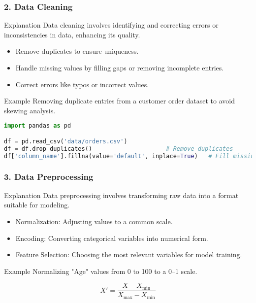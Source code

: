 \documentclass[aspectratio=169]{beamer}
\begin{document}
\begin{frame}
    \frametitle{2. Data Cleaning}
    \begin{block}{Explanation}
        Data cleaning involves identifying and correcting errors or inconsistencies in data, enhancing its quality.
    \end{block}

    \begin{itemize}
        \item Remove duplicates to ensure uniqueness.
        \item Handle missing values by filling gaps or removing incomplete entries.
        \item Correct errors like typos or incorrect values.
    \end{itemize}

    \begin{block}{Example}
        Removing duplicate entries from a customer order dataset to avoid skewing analysis.
    \end{block}
    
    \begin{lstlisting}[language=Python]
import pandas as pd

df = pd.read_csv('data/orders.csv')
df = df.drop_duplicates()                     # Remove duplicates
df['column_name'].fillna(value='default', inplace=True)   # Fill missing values
    \end{lstlisting}
\end{frame}

\begin{frame}
    \frametitle{3. Data Preprocessing}
    \begin{block}{Explanation}
        Data preprocessing involves transforming raw data into a format suitable for modeling.
    \end{block}

    \begin{itemize}
        \item Normalization: Adjusting values to a common scale.
        \item Encoding: Converting categorical variables into numerical form.
        \item Feature Selection: Choosing the most relevant variables for model training.
    \end{itemize}

    \begin{block}{Example}
        Normalizing "Age" values from 0 to 100 to a 0–1 scale.
    \end{block}

    \begin{equation}
        X' = \frac{X - X_{\text{min}}}{X_{\text{max}} - X_{\text{min}}}
    \end{equation}

\end{frame}
\end{document}
